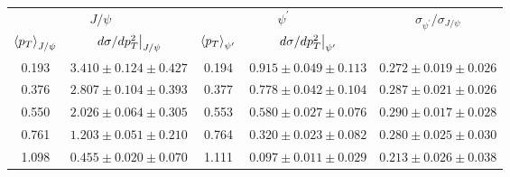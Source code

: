 \begin{tabular}{cc|cc|c}
\hline
\multicolumn{2}{c|}{$J/\psi$} &
  \multicolumn{2}{c|}{$\psi^{\prime}$} &
  \multirow{2}{*}{$\sigma_{\psi^\prime}/\sigma_{J/\psi}$} \\ \cline{1-4}
$\expval{p_T}_{J/\psi}$ &
  $\eval{d\sigma/dp^2_T}_{J/\psi}$ &
  $\expval{p_T}_{\psi^\prime}$ &
  $\eval{d\sigma/dp^2_T}_{\psi^\prime}$ &
   \\ \hline
0.193 & $3.410\pm0.124\pm0.427$ & 0.194 & $0.915\pm0.049\pm0.113$ & $0.272\pm0.019\pm0.026$ \\
0.376 & $2.807\pm0.104\pm0.393$ & 0.377 & $0.778\pm0.042\pm0.104$ & $0.287\pm0.021\pm0.026$ \\
0.550 & $2.026\pm0.064\pm0.305$ & 0.553 & $0.580\pm0.027\pm0.076$ & $0.290\pm0.017\pm0.028$ \\
0.761 & $1.203\pm0.051\pm0.210$ & 0.764 & $0.320\pm0.023\pm0.082$ & $0.280\pm0.025\pm0.030$ \\
1.098 & $0.455\pm0.020\pm0.070$ & 1.111 & $0.097\pm0.011\pm0.029$ & $0.213\pm0.026\pm0.038$ \\ \hline
\end{tabular}
